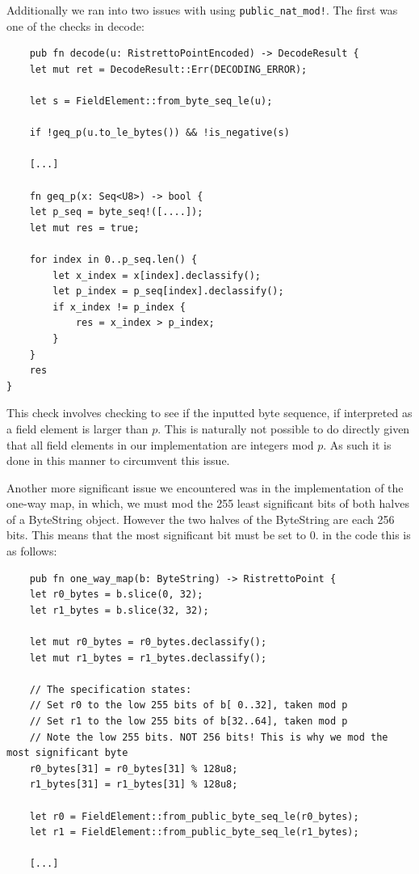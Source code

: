 \documentclass{article}
\begin{document}
Additionally we ran into two issues with using
\texttt{public\_nat\_mod!}. The first was one of the checks in decode:

\begin{lstlisting}
	pub fn decode(u: RistrettoPointEncoded) -> DecodeResult {
    let mut ret = DecodeResult::Err(DECODING_ERROR);

    let s = FieldElement::from_byte_seq_le(u);

    if !geq_p(u.to_le_bytes()) && !is_negative(s)

	[...]

	fn geq_p(x: Seq<U8>) -> bool {
    let p_seq = byte_seq!([....]);
    let mut res = true;

    for index in 0..p_seq.len() {
        let x_index = x[index].declassify();
        let p_index = p_seq[index].declassify();
        if x_index != p_index {
            res = x_index > p_index;
        }
    }
    res
}
\end{lstlisting}

This check involves checking to see if the inputted byte sequence, if
interpreted as a field element is larger than $p$. This is naturally
not possible to do directly given that all field elements in our
implementation are integers mod $p$. As such it is done in this manner
to circumvent this issue.

Another more significant issue we encountered was in the implementation
of the one-way map, in which, we must mod the 255 least significant
bits of both halves of a ByteString object. However the two halves of
the ByteString are each 256 bits. This means that the most significant
bit must be set to 0. in the code this is as follows:

\begin{lstlisting}
	pub fn one_way_map(b: ByteString) -> RistrettoPoint {
    let r0_bytes = b.slice(0, 32);
    let r1_bytes = b.slice(32, 32);

    let mut r0_bytes = r0_bytes.declassify();
    let mut r1_bytes = r1_bytes.declassify();

    // The specification states:
    // Set r0 to the low 255 bits of b[ 0..32], taken mod p
    // Set r1 to the low 255 bits of b[32..64], taken mod p
    // Note the low 255 bits. NOT 256 bits! This is why we mod the most significant byte
    r0_bytes[31] = r0_bytes[31] % 128u8;
    r1_bytes[31] = r1_bytes[31] % 128u8;

    let r0 = FieldElement::from_public_byte_seq_le(r0_bytes);
    let r1 = FieldElement::from_public_byte_seq_le(r1_bytes);

	[...]
\end{lstlisting}
\end{document}
